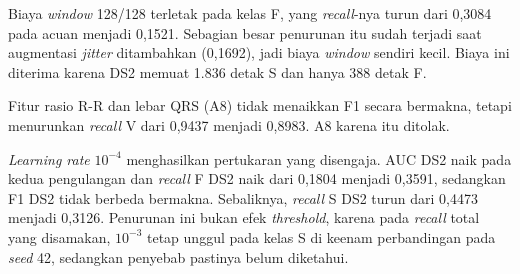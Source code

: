 Biaya \textit{window} 128/128 terletak pada kelas F, yang \textit{recall}-nya turun dari 0,3084 pada acuan menjadi 0,1521. Sebagian besar penurunan itu sudah terjadi saat augmentasi \textit{jitter} ditambahkan (0,1692), jadi biaya \textit{window} sendiri kecil. Biaya ini diterima karena DS2 memuat 1.836 detak S dan hanya 388 detak F.

Fitur rasio R-R dan lebar QRS (A8) tidak menaikkan F1 secara bermakna, tetapi menurunkan \textit{recall} V dari 0,9437 menjadi 0,8983. A8 karena itu ditolak.


\textit{Learning rate} $10^{-4}$ menghasilkan pertukaran yang disengaja. AUC DS2 naik pada kedua pengulangan dan \textit{recall} F DS2 naik dari 0,1804 menjadi 0,3591, sedangkan F1 DS2 tidak berbeda bermakna. Sebaliknya, \textit{recall} S DS2 turun dari 0,4473 menjadi 0,3126. Penurunan ini bukan efek \textit{threshold}, karena pada \textit{recall} total yang disamakan, $10^{-3}$ tetap unggul pada kelas S di keenam perbandingan pada \textit{seed} 42, sedangkan penyebab pastinya belum diketahui.


